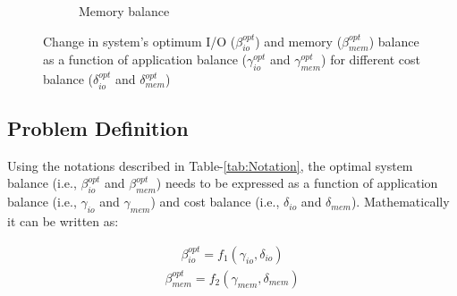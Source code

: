 \documentclass[journal]{IEEEtran}
\begin{document}
\begin{figure}[htb]
\begin{subfigure}[b]{0.48\textwidth}
                \caption{Memory balance}
                \label{fig:beta_mem}
   \end{subfigure}
   \caption{Change in system's optimum I/O ($\beta_{io}^{opt}$) and memory ($\beta_{mem}^{opt}$) balance as a function of application balance ($\gamma_{io}^{opt}$ and $\gamma_{mem}^{opt}$) for different cost balance ($\delta_{io}^{opt}$ and $\delta_{mem}^{opt}$)}
  \label{fig:BetaVsGamma}
\end{figure}
\subsection{Problem Definition}
Using the notations described in Table-\ref{tab:Notation}, the optimal system balance (i.e., $\beta_{io}^{opt}$ and $\beta_{mem}^{opt}$) needs to be expressed as a function of application balance (i.e., $\gamma_{io}$ and $\gamma_{mem}$) and cost balance (i.e., $\delta_{io}$ and $\delta_{mem}$). Mathematically it can be written as:

\begin{equation} \label{eqn:BalancedIONotation}
\begin{split}
\beta_{io}^{opt} = f_1(\gamma_{io}, \delta_{io})
\end{split}
\end{equation}
\begin{equation} \label{eqn:BalancedMemNotation}
\begin{split}
\beta_{mem}^{opt} = f_2(\gamma_{mem}, \delta_{mem})
\end{split}
\end{equation}
\end{document}
